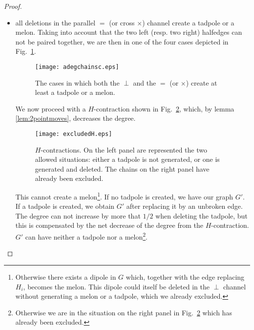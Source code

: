\documentclass[10pt]{article}
\theoremstyle{plain}
\theoremstyle{definition}
\begin{document}
\begin{proof}
\begin{description}
\begin{itemize}
\begin{itemize}
   \item all deletions in the  parallel $=$ (or cross $\times$) channel create a tadpole or a melon. Taking into account that the two left (resp. two right) halfedges can not be paired together, we are
   then in one of the four cases depicted in Fig.~\ref{fig:adegchains}.
  \begin{figure}[htb]
 \begin{center}
 \texttt{[image: adegchainsc.eps]}  
 \caption{The cases in which both the $\perp$ and the $=$ (or $\times$) create at least a tadpole or a melon.} \label{fig:adegchains}
 \end{center}
 \end{figure}
 
We now proceed with a $H$-contraction shown in Fig.~\ref{fig:excludedH}, which, by lemma \ref{lem:2pointmoves}, decreases the  degree. 
\begin{figure}[htb]
 \begin{center}
 \texttt{[image: excludedH.eps]}  
 \caption{$H$-contractions. On the left panel are represented the two allowed situations: either a tadpole is not generated, or one is generated and deleted. 
 The chains on the right panel have already been excluded.}\label{fig:excludedH}
 \end{center}
 \end{figure} 

This cannot create a melon\footnote{Otherwise there exists a dipole in $G$ which, together with the edge replacing $H_i$, becomes the melon. This dipole could 
itself be deleted in the $\perp$ channel without generating a melon or a tadpole, which we already excluded.}. 
If no tadpole is created, we have our graph $G'$. If a tadpole is created, we obtain $G'$ after replacing it by an unbroken edge. 
The degree can not increase by more that $1/2$ when deleting the tadpole, but this is compensated by the net decrease of the degree from the $H$-contraction.
$G'$ can have neither a tadpole nor a melon\footnote{Otherwise we are in the situation on the right panel in Fig.~\ref{fig:excludedH} which has already been 
excluded.}.
 
 \end{itemize}
 
 \end{itemize}


\end{description}

\end{proof}
\end{document}
